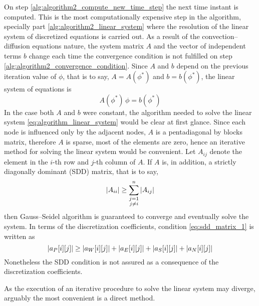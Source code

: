On step \ref{alg:algorithm2_compute_new_time_step} the next time instant is computed. This is the most computationally expensive step in the algorithm, specially part \ref{alg:algorithm2_linear_system} where the resolution of the linear system of discretized equations is carried out. As a result of the convection--diffusion equations nature, the system matrix $A$ and the vector of independent terms $b$ change each time the convergence condition is not fulfilled on step \eqref{alg:algorithm2_convergence_condition}. Since $A$ and $b$ depend on the previous iteration value of $\phi$, that is to say, $A = A(\phi^\ast)$ and $b = b(\phi^\ast)$, the linear system of equations is
\begin{equation} \label{eq:algorithm_linear_system}
	A(\phi^\ast) \, \phi = b(\phi^\ast)
\end{equation}
In the case both $A$ and $b$ were constant, the algorithm needed to solve the linear system \eqref{eq:algorithm_linear_system} would be clear at first glance. Since each node is influenced only by the adjacent nodes, $A$ is a pentadiagonal by blocks matrix, therefore $A$ is sparse, \ie most of the elements are zero, hence an iterative method for solving the linear system would be convenient. Let $A_{ij}$ denote the element in the $i$-th row and $j$-th column of $A$. If $A$ is, in addition, a strictly diagonally dominant (SDD) matrix, that is to say,
\begin{equation} \label{eq:sdd_matrix_1}
	\abs{A_{ii}} \geq 
	\sum_{\substack{j = 1 \\ j \neq i}}^n \abs{A_{ij}} 
\end{equation}
then Gauss--Seidel algorithm is guaranteed to converge and eventually solve the system. In terms of the discretization coefficients, condition \eqref{eq:sdd_matrix_1} is written as
\begin{equation}
	\abs{a_P[i][j]} \geq 
	\abs{a_W[i][j]} +
	\abs{a_E[i][j]} +
	\abs{a_S[i][j]} +
	\abs{a_N[i][j]}
\end{equation}
Nonetheless the SDD condition is not assured as a consequence of the discretization coefficients.

As the execution of an iterative procedure to solve the linear system may diverge, arguably the most convenient is a direct method.

